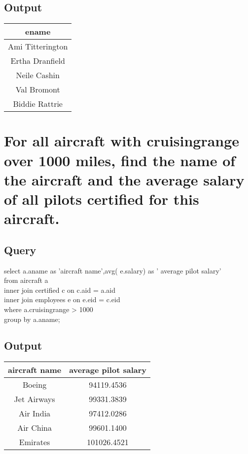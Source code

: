 \documentclass[11pt]{scrartcl} %
\begin{document}
\subsection{Output}
\begin{left}
\begin{tabular}{ | c | }
\hline
\textbf{ename} \\
\hline
Ami Titterington\\
Ertha Dranfield\\
Neile Cashin\\
Val Bromont\\
Biddie Rattrie\\

\hline

\end{tabular}
\end{left}






\section{For all aircraft with cruisingrange over 1000 miles, find the name of the aircraft and the average salary of all pilots certified for this aircraft.}

\subsection{Query}
select a.aname as 'aircraft name',avg( e.salary) as ' average pilot salary' \\
from aircraft a \\
inner join certified c on c.aid = a.aid\\
inner join employees e on e.eid = c.eid\\
where a.cruisingrange > 1000\\
group by a.aname;

\subsection{Output}
\begin{left}
\begin{tabular}{ | c | c | }
\hline
\textbf{aircraft name} & \textbf{average pilot salary}\\
\hline
 Boeing & 94119.4536  \\ 
 Jet Airways & 99331.3839  \\  
 Air India & 97412.0286 \\  
Air China &	99601.1400\\
Emirates &	101026.4521\\
\hline

\end{tabular}
\end{left}
\end{document}
